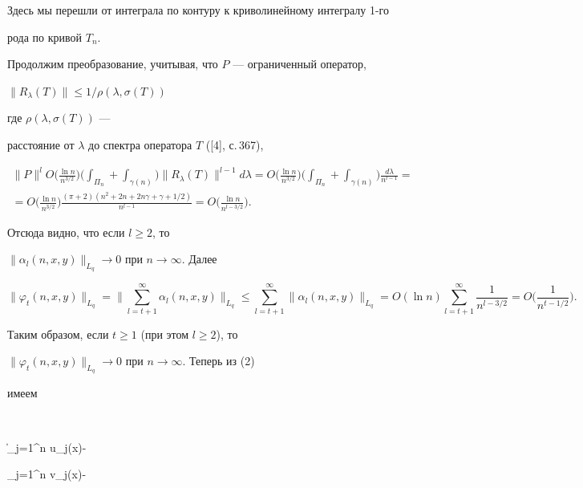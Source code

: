 Здесь мы перешли от интеграла по контуру к криволинейному интегралу 1-го


рода по кривой $T_n$.


Продолжим преобразование, учитывая, что $P$ --- ограниченный оператор,


$\|R_\lambda(T)\|\le 1/{\rho(\lambda,\sigma(T))}$


где $\rho(\lambda,\sigma(T))$ ---


расстояние от $\lambda$ до спектра оператора $T$ ([4], с.\,367),


\begin{multline*}


\|P\|^lO\bigg(\frac{\ln n}{n^{3/2}}\bigg)\bigg


(\int_{\Pi_n}+\int_{\gamma(n)}\bigg)\|R_\lambda(T)\|^{l-1}d\lambda=


O\bigg(\frac{\ln n}{n^{3/2}}\bigg)\bigg(\int_{\Pi_n}+\int_{\gamma(n)}


\bigg)\frac{d\lambda}{n^{l-1}}= \\


%


= O\bigg(\frac{\ln n}{n^{3/2}}\bigg)


\frac{(\pi+2)(n^2+2n+2n\gamma+\gamma+1/2)}{n^{l-1}}=


O\bigg(\frac{\ln n}{n^{l-3/2}}\bigg).


\end{multline*}


Отсюда видно, что если $l\ge2$, то


$\|\alpha_l(n,x,y)\|_{L_q}\to 0$ при $n\to\infty$. Далее


$$


\|\varphi_t(n,x,y)\|_{L_q}=


\bigg\|\sum_{l=t+1}^\infty \alpha_l(n,x,y)\bigg\|_{L_q} \le


\sum_{l=t+1}^\infty \|\alpha_l(n,x,y)\|_{L_q} =


O(\ln n)\sum_{l=t+1}^\infty \frac1{n^{l-3/2}} =


O\bigg(\frac1{n^{t-1/2}}\bigg).


$$


Таким образом, если $t\ge1$ (при этом $l\ge2$), то


$\|\varphi_t(n,x,y)\|_{L_q}\to 0$ при $n\to\infty$. Теперь из (2)


имеем


$$


\bigg\|\sum_{j=1}^n u_j(x)-


\sum_{j=1}^n v_j(x)-


